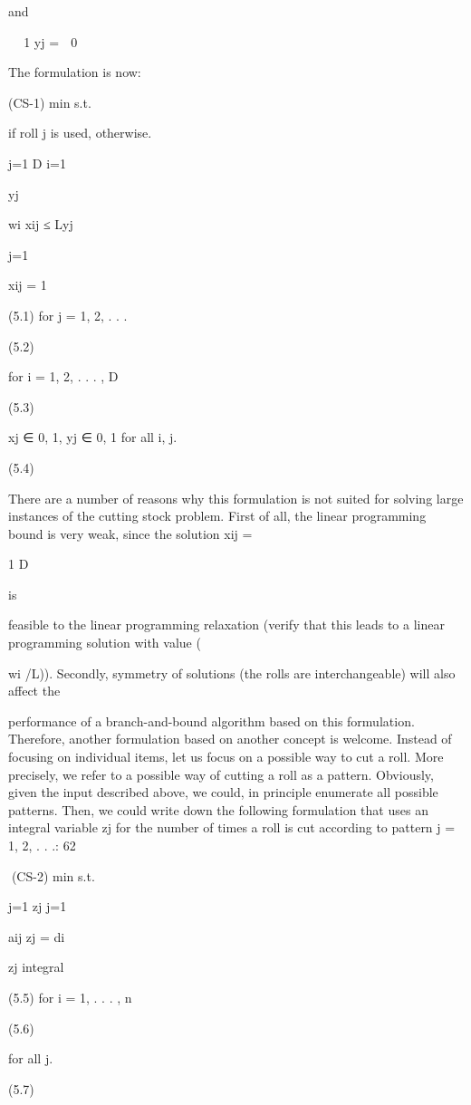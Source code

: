 \documentclass[titlepage]{book}
\theoremstyle{plain}
\theoremstyle{definition}
\theoremstyle{remark}
\begin{document}
and


 1
yj =
 0

The formulation is now:

(CS-1) min
s.t.

if roll j is used,
otherwise.

j=1
D
i=1

yj

wi xij ≤ Lyj

j=1

xij = 1

(5.1)
for j = 1, 2, . . .

(5.2)

for i = 1, 2, . . . , D

(5.3)

xj ∈ {0, 1}, yj ∈ {0, 1} for all i, j.

(5.4)

There are a number of reasons why this formulation is not suited for solving large instances of the cutting
stock problem. First of all, the linear programming bound is very weak, since the solution xij =

1
D

is

feasible to the linear programming relaxation (verify that this leads to a linear programming solution
with value (

wi /L)). Secondly, symmetry of solutions (the rolls are interchangeable) will also affect the

performance of a branch-and-bound algorithm based on this formulation. Therefore, another formulation
based on another concept is welcome. Instead of focusing on individual items, let us focus on a possible
way to cut a roll. More precisely, we refer to a possible way of cutting a roll as a pattern. Obviously,
given the input described above, we could, in principle enumerate all possible patterns. Then, we could
write down the following formulation that uses an integral variable zj for the number of times a roll is
cut according to pattern j = 1, 2, . . .:
62

(CS-2) min
s.t.

j=1 zj
j=1

aij zj = di

zj integral

(5.5)
for i = 1, . . . , n

(5.6)

for all j.

(5.7)
\end{document}
